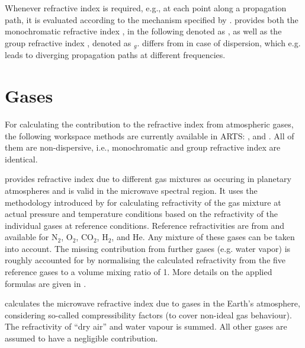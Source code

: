 Whenever refractive index is required, e.g., at each point along a propagation 
path, it is evaluated according to the mechanism specified by 
.  provides both the 
monochromatic refractive index , in the following denoted as \Rfr, as well 
as the group refractive index , denoted as \Rfr$_{g}$.
 differs from  in case of dispersion, which e.g. leads to diverging propagation paths at different frequencies.



\section{Gases}
%
For calculating the contribution to the refractive index from atmospheric gases, the following workspace methods are currently available in ARTS: ,
 and . All of them are non-dispersive, i.e., monochromatic and group refractive index are identical.

 provides refractive index due to different gas mixtures as occuring in planetary atmospheres and is valid in the microwave spectral region. It uses the methodology introduced by \citet{newell65:_absolute_jap} for calculating refractivity of the gas mixture at actual pressure and temperature conditions based on the refractivity of the individual gases at reference conditions. Reference refractivities are from \citet{newell65:_absolute_jap} and available for N$_2$, O$_2$, CO$_2$, H$_2$, and He. Any mixture of these gases can be taken into account. The missing contribution from further gases (e.g. water vapor) is roughly accounted for by normalising the calculated refractivity from the five reference gases to a volume mixing ratio of 1. More details on the applied formulas are given in \theory.  %

 calculates the microwave refractive index due to gases in the Earth’s atmosphere, considering so-called compressibility factors (to cover non-ideal gas behaviour). The refractivity of ``dry air'' and water vapour is summed. All other gases are assumed to have a negligible contribution. \citep{thayer74_improved_rs}

